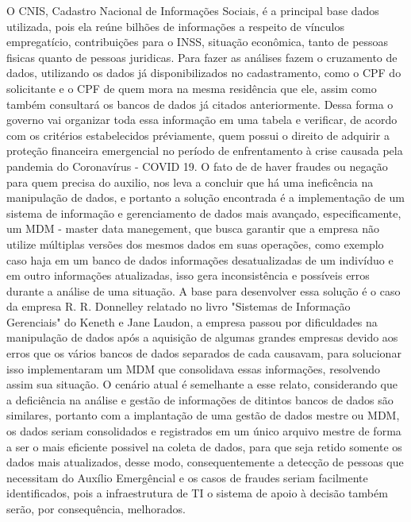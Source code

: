 \documentclass[12pt]{article}
\begin{document}
	O CNIS, Cadastro Nacional de Informações Sociais, é a principal base dados utilizada, pois ela reúne bilhões de informações a respeito de vínculos empregatício, contribuições para o INSS, situação econômica, tanto de pessoas fisicas quanto de pessoas juridicas. Para fazer as análises fazem o cruzamento de dados, utilizando os dados já disponibilizados no cadastramento, como o CPF do solicitante e o CPF de quem mora na mesma residência que ele, assim como também consultará os bancos de dados já citados anteriormente. Dessa forma o governo vai organizar toda essa informação em uma tabela e verificar, de acordo com os critérios estabelecidos préviamente, quem possui o direito de adquirir a proteção financeira emergencial no período de enfrentamento à crise causada pela pandemia do Coronavírus - COVID 19.
\linebreak
\linebreak
	O fato de de haver fraudes ou negação para quem precisa do auxilio, nos leva a concluir que há uma ineficência na manipulação de dados, e portanto a solução encontrada é a implementação de um sistema de informação e gerenciamento de dados mais avançado, especificamente, um MDM - master data manegement, que busca garantir que a empresa não utilize múltiplas versões dos mesmos dados em suas operações, como exemplo caso haja em um banco de dados informações desatualizadas de um indivíduo e em outro informações atualizadas, isso gera inconsistência e possíveis erros durante a análise de uma situação.
\linebreak
\linebreak
	A base para desenvolver essa solução é o caso da empresa R. R. Donnelley relatado no livro "Sistemas de Informação Gerenciais" do Keneth e Jane Laudon, a empresa passou por dificuldades na manipulação de dados após a aquisição de algumas grandes empresas devido aos erros que os vários bancos de dados separados de cada causavam, para solucionar isso implementaram um MDM que consolidava essas informações, resolvendo assim sua situação.
\linebreak
\linebreak
	O cenário atual é semelhante a esse relato, considerando que a deficiência na análise e gestão de informações de ditintos bancos de dados são similares, portanto com a implantação de uma gestão de dados mestre ou MDM, os dados seriam consolidados e registrados em um único arquivo mestre de forma a ser o mais eficiente possivel na coleta de dados, para que seja retido somente os dados mais atualizados, desse modo, consequentemente a detecção de pessoas que necessitam do Auxílio Emergêncial e os casos de fraudes seriam facilmente identificados, pois a infraestrutura de TI o sistema de apoio à decisão também serão, por consequência, melhorados.
\end{document}
